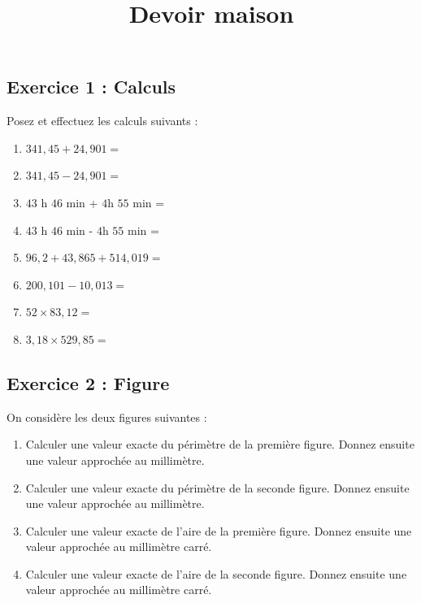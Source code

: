 \documentclass[14pt]{extreport}
\title{Devoir maison}
\date{}
\theoremstyle{plain}
\begin{document}
\subsection*{Exercice 1 : Calculs}  %


Posez et effectuez les calculs suivants : 
\begin{enumerate}
\item $341,45 + 24, 901 = $
\item $341,45 - 24, 901 =  $
\item $43$ h $46$ min + $4$h $55$ min = 
\item $43$ h $46$ min - $4$h $55$ min = 
\item $96,2 + 43, 865 + 514,019 = $
\item $200,101 - 10, 013 =  $
\item $52 \times 83,12 = $
\item $ 3,18 \times 529,85 = $
\end{enumerate}


\subsection*{Exercice 2 : Figure}

On considère les deux figures suivantes : 

\begin{figure}[H]
\center 
{}
\end{figure} 
\begin{enumerate}
\item Calculer une valeur exacte du périmètre de la première figure. Donnez ensuite une valeur approchée au millimètre. 

\item Calculer une valeur exacte du périmètre de la seconde figure. Donnez ensuite une valeur approchée au millimètre. 

\item Calculer une valeur exacte de l'aire de la première figure. Donnez ensuite une valeur approchée au millimètre carré. 

\item Calculer une valeur exacte de l'aire de la seconde figure. Donnez ensuite une valeur approchée au millimètre carré. 

\end{enumerate}  
\end{document}
